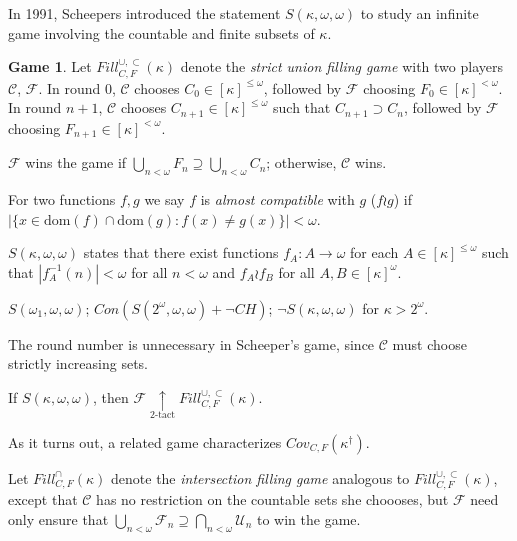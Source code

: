 \documentclass{beamer}
\theoremstyle{definition}
\newtheorem{game}[theorem]{Game}
\newcommand{\ktactwin}[1]{\underset{#1\text{-tact}}{\uparrow}}
\newcommand{\oneptlind}[1]{#1^\dagger}
\newcommand{\mengame}[1]{Cov_{C,F}(#1)}
\newcommand{\fillgameS}[1]{Fill^{\cup,\subset}_{C,F}(#1)}
\newcommand{\fillgameInt}[1]{Fill^{\cap}_{C,F}(#1)}
\newcommand{\<}{\langle}
\renewcommand{\>}{\rangle}
\newcommand{\mc}[1]{\mathcal{#1}}
\newcommand{\alcomp}{\wr}
\newcommand{\dom}{\textrm{dom}}
\newcommand{\alcompS}[1]{S(#1,\omega,\omega)}
\newcommand{\pl}[1]{\mathscr{#1}}
\newcommand{\term}{\textit}
\begin{document}
\begin{frame}
  In 1991, Scheepers introduced the statement $\alcompS\kappa$ to study an
  infinite game involving the countable and finite subsets of $\kappa$.

  \pause

  \begin{game}
    Let $\fillgameS\kappa$ denote the \term{strict union filling game}
    with two players $\pl C$, $\pl F$. In round $0$, $\pl C$ chooses
    $C_0\in[\kappa]^{\leq\omega}$, followed by $\pl F$ choosing
    $F_0\in[\kappa]^{<\omega}$. In round $n+1$, $\pl C$ chooses
    $C_{n+1}\in[\kappa]^{\leq\omega}$ such that $C_{n+1}\supset C_n$, followed
    by $\pl F$ choosing $F_{n+1}\in[\kappa]^{<\omega}$.

    $\pl F$ wins the game if
    $\bigcup_{n<\omega} F_n\supseteq\bigcup_{n<\omega} C_n$; otherwise, $\pl C$
    wins.
  \end{game}
\end{frame}

\begin{frame}
  \begin{definition}
    For two functions $f,g$ we say $f$ is \term{almost compatible} with
    $g$ ($f\alcomp g$) if $|\{x\in\dom(f)\cap\dom(g):f(x)\not=g(x)\}|<\omega$.
  \end{definition}
  \pause
  \begin{definition}
    $\alcompS\kappa$ states that there exist functions
    $f_A:A\to\omega$ for each $A\in[\kappa]^{\leq\omega}$ such that
    $|f_A^{-1}(n)|<\omega$ for all $n<\omega$ and
    $f_A\alcomp f_B$ for all $A,B\in[\kappa]^\omega$.
  \end{definition}
  \pause
  \begin{theorem}
    $\alcompS{\omega_1}$; $Con(\alcompS{2^\omega}+\neg CH)$;
    $\neg\alcompS\kappa$ for $\kappa>2^\omega$.
  \end{theorem}
\end{frame}

\begin{frame}
  The round number is unnecessary in Scheeper's game, since $\pl C$ must
  choose strictly increasing sets.

  \begin{theorem}
    If $\alcompS\kappa$, then $\pl F\ktactwin2 \fillgameS\kappa$.
  \end{theorem}

  \pause

  As it turns out, a related game characterizes $\mengame{\oneptlind\kappa}$.

  \begin{definition}
    Let $\fillgameInt\kappa$ denote the \term{intersection filling game}
    analogous to $\fillgameS\kappa$, except that $\pl C$ has no restriction
    on the countable sets she choooses, but $\pl F$ need only ensure that
    $\bigcup_{n<\omega}\mc F_n\supseteq \bigcap_{n<\omega}\mc U_n$ to win
    the game.
  \end{definition}
\end{frame}
\end{document}
